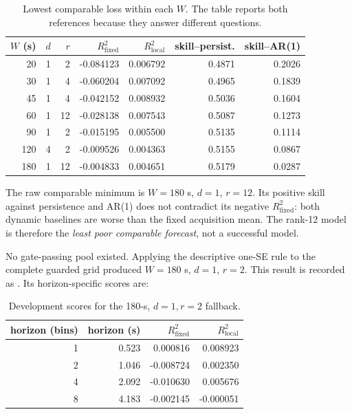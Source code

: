 \documentclass[11pt]{article}
\newcommand{\Rfixed}{R^2_{\mathrm{fixed}}}
\newcommand{\Rlocal}{R^2_{\mathrm{local}}}
\begin{document}
\begin{table}[htbp]
\centering
\caption{Lowest comparable loss within each \(W\).  The table reports both
references because they answer different questions.}
\label{tab:window}
\begin{tabular}{rrrrrrr}
\toprule
\(W\) (s) & \(d\) & \(r\) & \(\Rfixed\) & \(\Rlocal\) &
skill--persist. & skill--AR(1) \\
\midrule
20  & 1 & 2  & -0.084123 & 0.006792 & 0.4871 & 0.2026 \\
30  & 1 & 4  & -0.060204 & 0.007092 & 0.4965 & 0.1839 \\
45  & 1 & 4  & -0.042152 & 0.008932 & 0.5036 & 0.1604 \\
60  & 1 & 12 & -0.028138 & 0.007543 & 0.5087 & 0.1273 \\
90  & 1 & 2  & -0.015195 & 0.005500 & 0.5135 & 0.1114 \\
120 & 4 & 2  & -0.009526 & 0.004363 & 0.5155 & 0.0867 \\
180 & 1 & 12 & -0.004833 & 0.004651 & 0.5179 & 0.0287 \\
\bottomrule
\end{tabular}
\end{table}

The raw comparable minimum is \(W=180\) s, \(d=1\), \(r=12\).  Its positive
skill against persistence and AR(1) does not contradict its negative
\(\Rfixed\): both dynamic baselines are worse than the fixed acquisition mean.
The rank-12 model is therefore the \emph{least poor comparable forecast}, not
a successful model.

No gate-passing pool existed.  Applying the descriptive one-SE rule to the
complete guarded grid produced \(W=180\) s, \(d=1\), \(r=2\).  This result is
recorded as .  Its
horizon-specific scores are:

\begin{table}[htbp]
\centering
\caption{Development scores for the 180-s, \(d=1,r=2\) fallback.}
\label{tab:fallback-horizon}
\begin{tabular}{rrrr}
\toprule
horizon (bins) & horizon (s) & \(\Rfixed\) & \(\Rlocal\) \\
\midrule
1 & 0.523 &  0.000816 &  0.008923 \\
2 & 1.046 & -0.008724 &  0.002350 \\
4 & 2.092 & -0.010630 &  0.005676 \\
8 & 4.183 & -0.002145 & -0.000051 \\
\bottomrule
\end{tabular}
\end{table}
\end{document}
